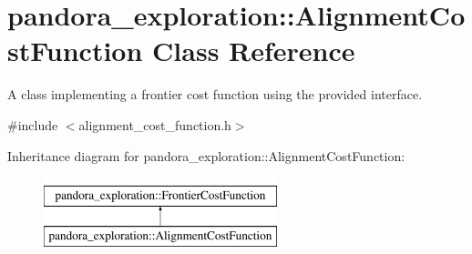 \hypertarget{classpandora__exploration_1_1_alignment_cost_function}{\section{pandora\-\_\-exploration\-:\-:\-Alignment\-Cost\-Function \-Class \-Reference}
\label{classpandora__exploration_1_1_alignment_cost_function}
}


\-A class implementing a frontier cost function using the provided interface.  




{\ttfamily \#include $<$alignment\-\_\-cost\-\_\-function.\-h$>$}

\-Inheritance diagram for pandora\-\_\-exploration\-:\-:\-Alignment\-Cost\-Function\-:\begin{figure}[H]
\begin{center}
\leavevmode
\includegraphics[height=2.000000cm]{classpandora__exploration_1_1_alignment_cost_function}
\end{center}
\end{figure}
